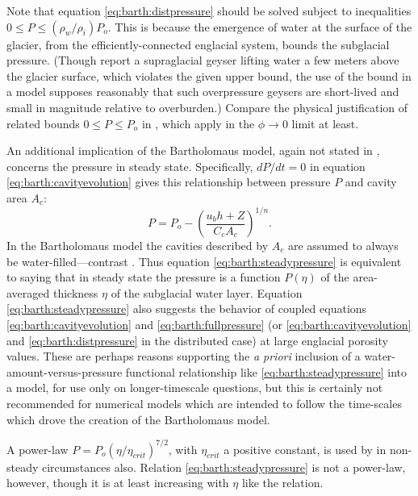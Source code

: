\documentclass[twocolumn,letterpaper]{igs}
\begin{document}
Note that equation \eqref{eq:barth:distpressure} should be solved subject to inequalities $0 \le P \le (\rho_w/\rho_i) P_o$.  This is because the emergence of water at the surface of the glacier, from the efficiently-connected englacial system, bounds the subglacial pressure.  (Though \cite{Bartholomausetal2011} report a supraglacial geyser lifting water a few meters above the glacier surface, which violates the given upper bound, the use of the bound in a model supposes reasonably that such overpressure geysers are short-lived and small in magnitude relative to overburden.)  Compare the physical justification of related bounds $0 \le P \le P_o$ in \cite{Schoofetal2012}, which apply in the $\phi\to 0$ limit at least.

An additional implication of the Bartholomaus model, again not stated in \cite{Bartholomausetal2011}, concerns the pressure in steady state.  Specifically, $dP/dt=0$ in equation \eqref{eq:barth:cavityevolution} gives this relationship between pressure $P$ and cavity area $A_c$:
\begin{equation}
P = P_o - \left(\frac{u_b h + Z}{C_c A_c}\right)^{1/n}. \label{eq:barth:steadypressure}
\end{equation}
In the Bartholomaus model the cavities described by $A_c$ are assumed to always be water-filled---contrast \citep{Schoofetal2012}.  Thus equation \eqref{eq:barth:steadypressure} is equivalent to saying that in steady state the pressure is a function $P(\eta)$ of the area-averaged thickness $\eta$ of the subglacial water layer. Equation \eqref{eq:barth:steadypressure} also suggests the behavior of coupled equations \eqref{eq:barth:cavityevolution} and \eqref{eq:barth:fullpressure} (or \eqref{eq:barth:cavityevolution} and \eqref{eq:barth:distpressure} in the distributed case) at large englacial porosity values.  These are perhaps reasons supporting the \emph{a priori} inclusion of a water-amount-versus-pressure functional relationship like \eqref{eq:barth:steadypressure} into a model, for use only on longer-timescale questions, but this is certainly not recommended for numerical models which are intended to follow the time-scales which drove the creation of the Bartholomaus model.

A power-law $P = P_o (\eta/\eta_{crit})^{7/2}$, with $\eta_{crit}$ a positive constant, is used by \cite{FlowersClarke2002_theory} in non-steady circumstances also.  Relation \eqref{eq:barth:steadypressure} is not a power-law, however, though it is at least increasing with $\eta$ like the \cite{FlowersClarke2002_theory} relation.
\end{document}
